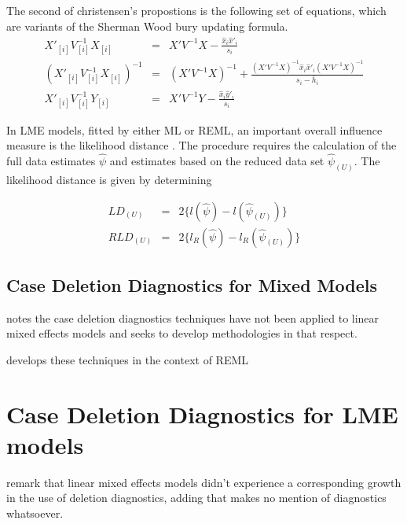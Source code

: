 \documentclass[MAIN.tex]{subfiles}
\begin{document}
	
	The second of christensen's propostions is the following set of
	equations, which are variants of the Sherman Wood bury updating
	formula.
	\begin{eqnarray}
	X'_{[i]}V_{[i]}^{-1}X_{[i]} &=& X' V^{-1}X -
	\frac{\hat{x}_{i}\hat{x}'_{i}}{s_{i}}\\
	(X'_{[i]}V_{[i]}^{-1}X_{[i]})^{-1} &=& (X' V^{-1}X)^{-1} +
	\frac{(X' V^{-1}X)^{-1}\hat{x}_{i}\hat{x}' _{i}
		(X' V^{-1}X)^{-1}}{s_{i}- \bar{h}_{i}}\\
	X'_{[i]}V_{[i]}^{-1}Y_{[i]} &=& X\prime V^{-1}Y -
	\frac{\hat{x}_{i}\hat{y}' _{i}}{s_{i}}
	\end{eqnarray}
	
	
	
	
	
	
	
	
	In LME models, fitted by either ML or REML, an important overall
	influence measure is the likelihood distance \citep{cook82}. The
	procedure requires the calculation of the full data estimates
	$\hat{\psi}$ and estimates based on the reduced data set
	$\hat{\psi}_{(U)}$. The likelihood distance is given by
	determining
	
	
	\begin{eqnarray}
	LD_{(U)} &=& 2\{l(\hat{\psi}) - l( \hat{\psi}_{(U)}) \}\\
	RLD_{(U)} &=& 2\{l_{R}(\hat{\psi}) - l_{R}(\hat{\psi}_{(U)})\}
	\end{eqnarray}

\subsection{Case Deletion Diagnostics for Mixed Models}

\citet{Christiansen} notes the case deletion diagnostics techniques have not been applied to linear mixed effects models and seeks to develop methodologies in that respect.

\citet{Christiansen} develops these techniques in the context of
REML
	
\section{Case Deletion Diagnostics for LME models}

\citet{HaslettDillane} remark that linear mixed effects models
didn't experience a corresponding growth in the use of deletion
diagnostics, adding that \citet{McCullSearle} makes no mention of
diagnostics whatsoever.
\end{document}
